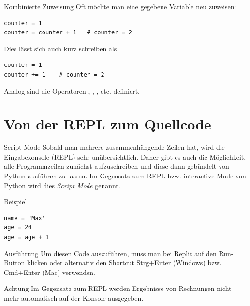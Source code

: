 \begin{fragile}[]
\begin{block}{Kombinierte Zuweisung}
\vspace{2pt}
Oft möchte man eine gegebene Variable neu zuweisen: 
\begin{verbatim}
counter = 1
counter = counter + 1 	# counter = 2
\end{verbatim}
\pause
Dies lässt sich auch kurz schreiben als 
\begin{verbatim}
counter = 1
counter += 1 	# counter = 2
\end{verbatim}
\pause
Analog sind die Operatoren \py{-=}, \py{*=}, \py{/=}, etc. definiert. 
\end{block}
\end{fragile}

\section{Von der REPL zum Quellcode}
\begin{frame}
\begin{block}{Script Mode}
	\vspace{2pt}
	Sobald man mehrere zusammenhängende Zeilen hat, wird die Eingabekonsole (REPL) sehr unübersichtlich. Daher gibt es auch die Möglichkeit, alle Programmzeilen zunächst aufzuschreiben und diese dann gebündelt von Python ausführen zu lassen. Im Gegensatz zum REPL bzw. interactive Mode von Python wird dies \emph{Script Mode} genannt.    
\end{block}
\end{frame}

\begin{fragile}[]
\begin{exampleblock}{Beispiel}
\begin{verbatim}
name = "Max"
age = 20
age = age + 1
\end{verbatim}
\end{exampleblock}

\vspace{12pt}

\pause
\begin{block}{Ausführung}
\vspace{2pt}
Um diesen Code auszuführen, muss man bei Replit auf den Run-Button klicken oder alternativ den Shortcut Strg+Enter (Windows) bzw. Cmd+Enter (Mac) verwenden.  
\end{block}

\vspace{12pt}

\pause

\begin{alertblock}{Achtung}
\vspace{2pt}
Im Gegensatz zum REPL werden Ergebnisse von Rechnungen nicht mehr automatisch auf der Konsole ausgegeben. 
\end{alertblock}

\end{fragile}



